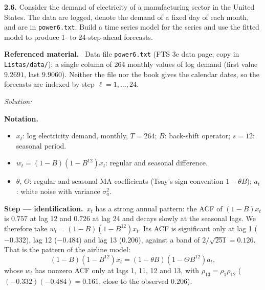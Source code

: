 \documentclass[11pt,a4paper]{article}
\newif\ifsolucoes
\newcommand{\espacoresol}{4.5cm}   %
\newenvironment{refmat}{\par\smallskip\noindent\begin{minipage}{\linewidth}\small\textbf{Referenced material.}~}{\end{minipage}\par\smallskip}
\newenvironment{notacao}{\par\smallskip\noindent\textbf{Notation.}\begin{itemize}[leftmargin=1.4em,topsep=1pt,itemsep=0pt]\small}{\end{itemize}}
\newcommand{\resolespaco}{\ifsolucoes\else\par\textit{Solution:}\vspace{\espacoresol}\par\fi}
\newcommand{\passo}[2]{\par\smallskip\noindent\textbf{Step --- #1.}~#2}
\begin{document}
\noindent\textbf{2.6.} Consider the demand of electricity of a manufacturing sector in the United States. The
data are logged, denote the demand of a fixed day of each month, and are in \texttt{power6.txt}. Build a time
series model for the series and use the fitted model to produce 1- to 24-step-ahead forecasts.
\begin{refmat}
Data file \texttt{power6.txt} (FTS 3e data page; copy in \texttt{Listas/data/}): a single column of 264
monthly values of log demand (first value $9.2691$, last $9.9060$). Neither the file nor the book gives the
calendar dates, so the forecasts are indexed by step $\ell=1,\dots,24$.
\end{refmat}
\resolespaco
\begin{sol}
\begin{notacao}
\item $x_t$: log electricity demand, monthly, $T=264$; $B$: back-shift operator; $s=12$: seasonal period.
\item $w_t=(1-B)(1-B^{12})x_t$: regular and seasonal difference.
\item $\theta$, $\Theta$: regular and seasonal MA coefficients (Tsay's sign convention $1-\theta B$); $a_t$: white noise with variance $\sigma_a^2$.
\end{notacao}

\passo{identification}{$x_t$ has a strong annual pattern: the ACF of $(1-B)x_t$ is $0.757$ at lag 12 and
$0.726$ at lag 24 and decays slowly at the seasonal lags. We therefore take $w_t=(1-B)(1-B^{12})x_t$. Its
ACF is significant only at lag 1 ($-0.332$), lag 12 ($-0.484$) and lag 13 ($0.206$), against a band of
$2/\sqrt{251}=0.126$. That is the pattern of the airline model:}
\begin{equation}\label{q26:air} (1-B)(1-B^{12})x_t=(1-\theta B)(1-\Theta B^{12})a_t , \end{equation}
whose $w_t$ has nonzero ACF only at lags 1, 11, 12 and 13, with $\rho_{13}=\rho_1\rho_{12}$
($(-0.332)(-0.484)=0.161$, close to the observed $0.206$).


\end{sol}
\end{document}
